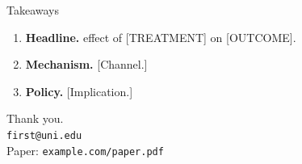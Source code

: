
\begin{frame}{Takeaways}
  \begin{enumerate}
    \item \textbf{Headline.} \headlineEstimate{} effect of
          [TREATMENT] on [OUTCOME].
    \item \textbf{Mechanism.} [Channel.]
    \item \textbf{Policy.} [Implication.]
  \end{enumerate}

  \vfill
  \begin{center}
    \large Thank you.\\[0.4em]
    \normalsize \texttt{first@uni.edu}\\
    Paper: \texttt{example.com/paper.pdf}
  \end{center}
\end{frame}
